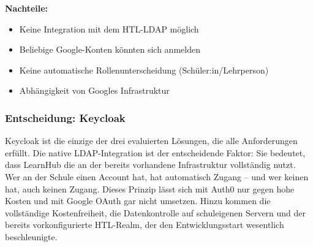 \textbf{Nachteile:}
\begin{itemize}
    \item Keine Integration mit dem HTL-LDAP möglich
    \item Beliebige Google-Konten könnten sich anmelden
    \item Keine automatische Rollenunterscheidung (Schüler:in/Lehrperson)
    \item Abhängigkeit von Googles Infrastruktur
\end{itemize}

\subsubsection{Entscheidung: Keycloak}

Keycloak ist die einzige der drei evaluierten Lösungen, die alle
Anforderungen erfüllt. Die native LDAP-Integration ist der
entscheidende Faktor: Sie bedeutet, dass LearnHub die an der 
bereits vorhandene Infrastruktur vollständig nutzt. Wer an der Schule
einen Account hat, hat automatisch Zugang -- und wer keinen hat, auch
keinen Zugang. Dieses Prinzip lässt sich mit Auth0 nur gegen hohe
Kosten und mit Google OAuth gar nicht umsetzen. Hinzu kommen die
vollständige Kostenfreiheit, die Datenkontrolle auf schuleigenen
Servern und der bereits vorkonfigurierte HTL-Realm, der den
Entwicklungsstart wesentlich beschleunigte.~\cite{keycloak-docs}


